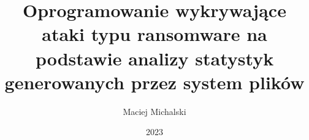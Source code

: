 \documentclass[thesis=inz,faculty=ee]{EE-dyplom}
\title{Oprogramowanie wykrywające ataki typu ransomware na podstawie analizy statystyk generowanych przez system plików}
\author{Maciej Michalski}
\date{2023}
\begin{document}
    \frontpages

    

    \bibliografia

    
    \listoffigures
    \listoftables
    \easyappendices
\end{document}
